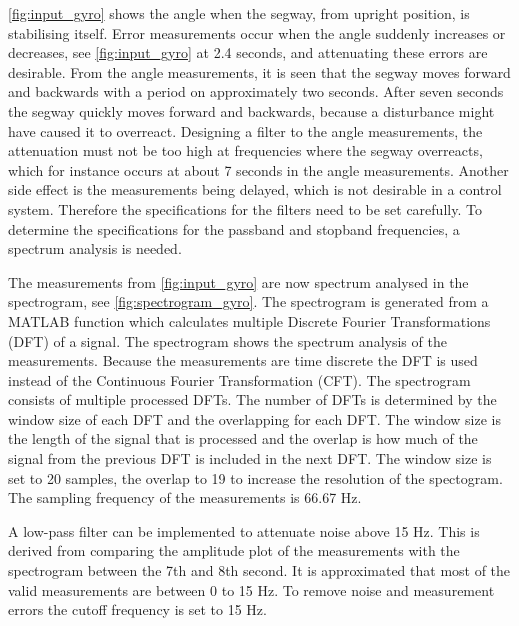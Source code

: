 \autoref{fig:input_gyro} shows the angle when the segway, from upright position, is stabilising itself. Error measurements occur when the angle suddenly increases or decreases, see \autoref{fig:input_gyro} at 2.4 seconds, and attenuating these errors are desirable. From the angle measurements, it is seen that the segway moves forward and backwards with a period on approximately two seconds. After seven seconds the segway quickly moves forward and backwards, because a disturbance might have caused it to overreact. Designing a filter to the angle measurements, the attenuation must not be too high at frequencies where the segway overreacts, which for instance occurs at about 7 seconds in the angle measurements. Another side effect is the measurements being delayed, which is not desirable in a control system. Therefore the specifications for the filters need to be set carefully. To determine the specifications for the passband and stopband frequencies, a spectrum analysis is needed.

The measurements from \autoref{fig:input_gyro} are now spectrum analysed in the spectrogram, see \autoref{fig:spectrogram_gyro}. The spectrogram is generated from a MATLAB function which calculates multiple Discrete Fourier Transformations (DFT) of a signal. The spectrogram shows the spectrum analysis of the measurements. Because the measurements are time discrete the DFT is used instead of the Continuous Fourier Transformation (CFT). The spectrogram consists of multiple processed DFTs. The number of DFTs is determined by the window size of each DFT and the overlapping for each DFT. The window size is the length of the signal that is processed and the overlap is how much of the signal from the previous DFT is included in the next DFT. The window size is set to 20 samples, the overlap to 19 to increase the resolution of the spectogram. 	The sampling frequency of the measurements is 66.67 Hz.

A low-pass filter can be implemented to attenuate noise above 15 Hz. This is derived from comparing the amplitude plot of the measurements with the spectrogram between the 7th and 8th second. It is approximated that most of the valid measurements are between 0 to 15 Hz. To remove noise and measurement errors the cutoff frequency is set to 15 Hz.

